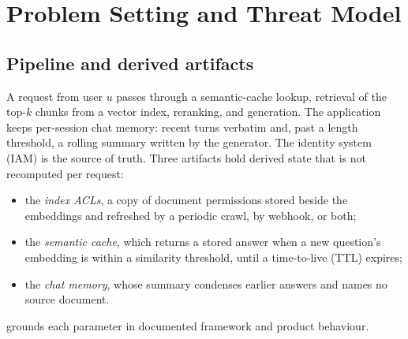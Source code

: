 \section{Problem Setting and Threat Model}
\label{sec:threat}

\subsection{Pipeline and derived artifacts}
A request from user $u$ passes through a semantic-cache lookup, retrieval of the top-$k$ chunks from
a vector index, reranking, and generation. The application keeps per-session chat memory: recent
turns verbatim and, past a length threshold, a rolling summary written by the generator. The
identity system (IAM) is the source of truth. Three artifacts hold derived state that is not
recomputed per request:
\begin{itemize}
\item the \emph{index ACLs}, a copy of document permissions stored beside the embeddings and
refreshed by a periodic crawl, by webhook, or both;
\item the \emph{semantic cache}, which returns a stored answer when a new question's embedding is
within a similarity threshold, until a time-to-live (TTL) expires;
\item the \emph{chat memory}, whose summary condenses earlier answers and names no source document.
\end{itemize}
 grounds each parameter in documented framework and product behaviour.

